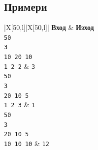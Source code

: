 \documentclass[12pt]{article}
\begin{document}
\subsection{Примери}
\begin{table}[!ht]
	\begin{tblr}{|X[50,l]|X[50,l]|}
		\hline
		\textbf{Вход} & \textbf{Изход} \\
		\hline
		\texttt{50 \\
			3\\
			10 20 10\\
			1 2 2}
		&
		\texttt{3}
		\\
		\hline
		\texttt{50 \\
			3\\
			20 10 5\\
			1 2 3}
		&
		\texttt{1}
		\\
		\hline
		\texttt{50 \\
			3\\
			20 10 5\\
			10 10 10}
		&
		\texttt{12}
		\\
		\hline
	\end{tblr}
\end{table}
\FloatBarrier
\end{document}

